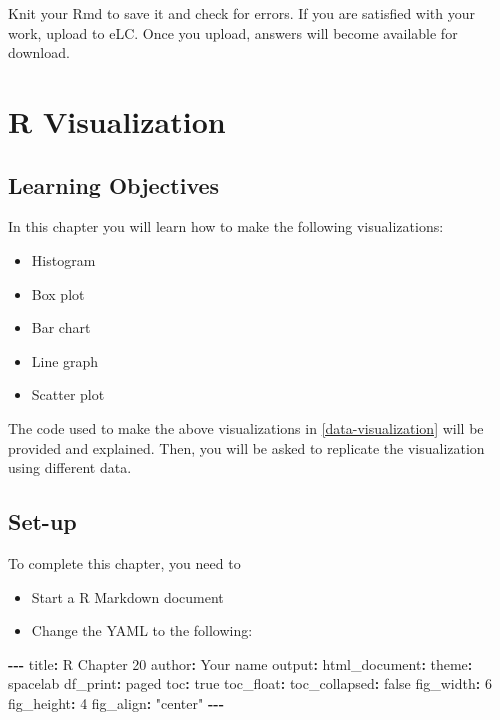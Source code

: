 \documentclass[
]{book}
\makeatletter
\newenvironment{Shaded}{\begin{snugshade}}{\end{snugshade}}
\newcommand{\DecValTok}[1]{\textcolor[rgb]{0.06,0.06,0.06}{#1}}
\newcommand{\NormalTok}[1]{#1}
\newcommand{\SpecialCharTok}[1]{\textcolor[rgb]{0.43,0.43,0.43}{\textbf{#1}}}
\newcommand{\StringTok}[1]{\textcolor[rgb]{0.5,0.5,0.5}{#1}}
\providecommand{\tightlist}{%
  \setlength{\itemsep}{0pt}\setlength{\parskip}{0pt}}
\newenvironment{kframe}{%
\medskip{}
\setlength{\fboxsep}{.8em}
 \def\at@end@of@kframe{}%
 \ifinner\ifhmode%
  \def\at@end@of@kframe{\end{minipage}}%
  \begin{minipage}{\columnwidth}%
 \fi\fi%
 \def\FrameCommand##1{\hskip\@totalleftmargin \hskip-\fboxsep
 \colorbox{shadecolor}{##1}\hskip-\fboxsep
     \hskip-\linewidth \hskip-\@totalleftmargin \hskip\columnwidth}%
 \MakeFramed {\advance\hsize-\width
   \@totalleftmargin\z@ \linewidth\hsize
   \@setminipage}}%
 {\par\unskip\endMakeFramed%
 \at@end@of@kframe}
\renewenvironment{Shaded}{\begin{kframe}}{\end{kframe}}
\makeatother
\begin{document}
Knit your Rmd to save it and check for errors. If you are satisfied with your work, upload to eLC. Once you upload, answers will become available for download.

\hypertarget{r-visualization}{%
\chapter{R Visualization}\label{r-visualization}}

\hypertarget{learning-objectives-3}{%
\section{Learning Objectives}\label{learning-objectives-3}}

In this chapter you will learn how to make the following visualizations:

\begin{itemize}
\tightlist
\item
  Histogram
\item
  Box plot
\item
  Bar chart
\item
  Line graph
\item
  Scatter plot
\end{itemize}

The code used to make the above visualizations in \ref{data-visualization} will be provided and explained. Then, you will be asked to replicate the visualization using different data.

\hypertarget{set-up-3}{%
\section{Set-up}\label{set-up-3}}

To complete this chapter, you need to

\begin{itemize}
\tightlist
\item
  Start a R Markdown document
\item
  Change the YAML to the following:
\end{itemize}

\begin{Shaded}
\begin{Highlighting}[]
\SpecialCharTok{{-}{-}{-}}
\NormalTok{title}\SpecialCharTok{:} \StringTok{\textquotesingle{}R Chapter 20\textquotesingle{}}
\NormalTok{author}\SpecialCharTok{:} \StringTok{\textquotesingle{}Your name\textquotesingle{}}
\NormalTok{output}\SpecialCharTok{:} 
\NormalTok{  html\_document}\SpecialCharTok{:}
\NormalTok{    theme}\SpecialCharTok{:}\NormalTok{ spacelab}
\NormalTok{    df\_print}\SpecialCharTok{:}\NormalTok{ paged}
\NormalTok{    toc}\SpecialCharTok{:}\NormalTok{ true}
\NormalTok{    toc\_float}\SpecialCharTok{:}
\NormalTok{      toc\_collapsed}\SpecialCharTok{:}\NormalTok{ false}
\NormalTok{    fig\_width}\SpecialCharTok{:} \DecValTok{6}
\NormalTok{    fig\_height}\SpecialCharTok{:} \DecValTok{4}
\NormalTok{    fig\_align}\SpecialCharTok{:} \StringTok{"center"}
\SpecialCharTok{{-}{-}{-}}
\end{Highlighting}
\end{Shaded}
\end{document}
